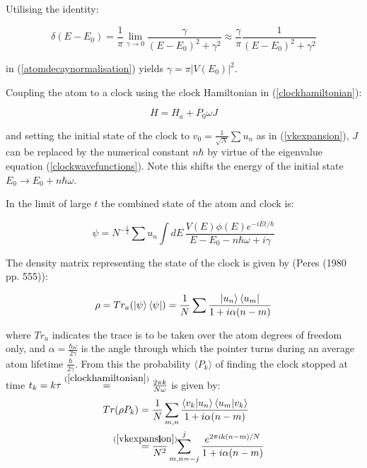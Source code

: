 \documentclass{article}
\begin{document}
\noindent Utilising the identity:

\begin{equation}
	\delta(E-E_0) = \frac{1}{\pi} \lim_{\gamma\to 0}\frac{\gamma}{(E-E_0)^2+\gamma^2} \approx \frac{\gamma}{\pi} \frac{1}{(E-E_0)^2+\gamma^2}
\end{equation}

\noindent in (\ref{atomdecaynormalisation}) yields $\gamma = \pi|V(E_0)|^2$.

\noindent Coupling the atom to a clock using the clock Hamiltonian in (\ref{clockhamiltonian}):

\begin{equation}
	H = H_a+P_0\omega J
\end{equation}

\noindent and setting the initial state of the clock to $v_0 = \frac{1}{\sqrt{N}}\sum u_n$ as in (\ref{vkexpansion}), $J$ can be replaced by the numerical constant $n\hbar$ by virtue of the eigenvalue equation (\ref{clockwavefunctions}). Note this shifts the energy of the initial state $E_0 \rightarrow E_0 + n\hbar\omega$.

\noindent In the limit of large $t$ the combined state of the atom and clock is:

\begin{equation}
	\psi = N^{-\frac{1}{2}}\sum u_n \int dE \, \frac{V(E)\phi(E)e^{-iEt/\hbar}}{E-E_0-n\hbar\omega+i\gamma}
\end{equation}

\noindent The density matrix representing the state of the clock is given by (Peres (1980 pp. 555)):

\begin{equation}
	\rho = Tr_a(\ket{\psi}\bra{\psi}) = \frac{1}{N}\sum \frac{\ket{u_n}\bra{u_m}}{1+i\alpha(n-m)}
\end{equation}

\noindent where $Tr_a$ indicates the trace is to be taken over the atom degrees of freedom only, and $\alpha = \frac{\hbar\omega}{2\gamma}$ is the angle through which the pointer turns during an average atom lifetime $\frac{\hbar}{2\gamma}$. From this the probability $\langle P_k \rangle$ of finding the clock stopped at time $t_k = k\tau \stackrel{(\ref{clockhamiltonian})}{=} \frac{2\pi k}{N\omega}$ is given by:
\begin{subequations}
\begin{align}
	Tr(\rho P_k) &= \frac{1}{N}\sum_{m,n} \frac{\braket{v_k|u_n}\braket{u_m|v_k}}{1+i\alpha(n-m)} \\
		     &\stackrel{\mathclap{(\ref{vkexpansion})}}{=} \frac{1}{N^2}\sum_{m,n=-j}^j \frac{e^{2\pi ik(n-m)/N}}{1+i\alpha(n-m)}
\end{align}
\end{subequations}
\end{document}
